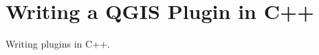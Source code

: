 \section{Writing a QGIS Plugin in C++}\label{cpp_plugin}

\updatedisclaimer

Writing plugins in C++.

\newpage



